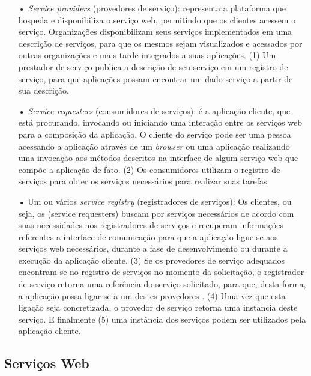 \begin{enumerate}

\item[•] \textit{Service providers} (provedores de serviço): representa a plataforma que hospeda e disponibiliza o serviço web, permitindo que os clientes acessem o serviço. Organizações disponibilizam seus serviços implementados em uma descrição de serviços, para que os mesmos sejam visualizados e acessados por outras organizações e mais tarde integrados a suas aplicações. (1) Um prestador de serviço publica a descrição de seu serviço em um registro de serviço, para que aplicações possam encontrar um dado serviço a partir de sua descrição. 

\item[•] \textit{Service requesters} (consumidores de serviços): é a aplicação cliente, que está procurando, invocando ou iniciando uma interação entre os serviços web para a composição da aplicação. O cliente do serviço pode ser uma pessoa acessando a aplicação através de um \textit{browser} ou uma aplicação realizando uma invocação aos métodos descritos na interface de algum serviço web que compõe a aplicação de fato. (2) Os consumidores utilizam o registro de serviços para obter os serviços necessários para realizar suas tarefas. 

\item[•] Um ou vários \textit{service registry} (registradores de serviços): Os clientes, ou seja, os (service requesters) buscam por serviços necessários de acordo com suas necessidades nos registradores de serviços e recuperam informações referentes a interface de comunicação para que a aplicação ligue-se aos serviços web necessários, durante a fase de desenvolvimento ou durante a execução da aplicação cliente. (3) Se os provedores de serviço adequados encontram-se no registro de serviços no momento da solicitação, o registrador de serviço retorna uma referência do serviço solicitado, para que, desta forma, a aplicação possa ligar-se a um destes provedores \cite{ZHANG}. (4) Uma vez que esta ligação seja concretizada, o provedor de serviço retorna uma instancia deste serviço. E finalmente (5) uma instância dos serviços podem ser utilizados pela aplicação cliente.

\end{enumerate}

\subsection{Serviços Web}
\label{definitions}

